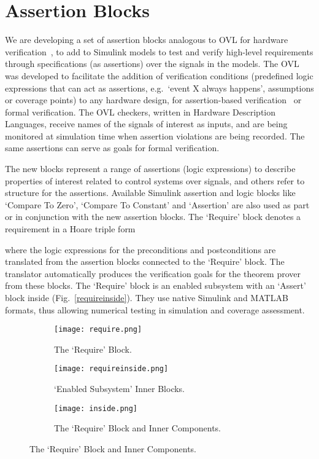 \documentclass[a4paper]{article}
\begin{document}
\section{Assertion Blocks}\label{assertions}

We are developing a set of assertion blocks analogous to OVL for hardware verification~\cite{OVL}, to add to Simulink models to test and verify high-level requirements through specifications (as assertions) over the signals in the models. The OVL was developed to facilitate the addition of verification conditions (predefined logic expressions that can act as assertions, e.g.\ `event X always happens', assumptions or coverage points) to any hardware design, for assertion-based verification~\cite{assertions} or formal verification. The OVL checkers, written in Hardware Description Languages, receive names of the signals of interest as inputs, and are being monitored at simulation time when assertion violations are being recorded. The same assertions can serve as goals for formal verification.

The new blocks represent a range of assertions (logic expressions) to describe properties of interest related to control systems over signals, and others refer to structure for the assertions. Available Simulink assertion and logic blocks like `Compare To Zero', `Compare To Constant' and `Assertion' are also used as part or in conjunction with the new assertion blocks. The `Require' block denotes a requirement in a Hoare triple form~\cite{Hoare}
 
where the logic expressions for the preconditions and postconditions are translated from the assertion blocks connected to the `Require' block. The translator automatically produces the verification goals for the theorem prover from these blocks. The `Require' block is an enabled subsystem with an `Assert' block inside (Fig.~\ref{requireinside}). They use native Simulink and MATLAB formats, thus allowing numerical testing in simulation and coverage assessment. 

\begin{figure}[!t]
\begin{center}
\begin{subfigure}{0.33\textwidth}
                \texttt{[image: require.png]}
                \caption{The `Require' Block.}
                \label{subsystem}
        \end{subfigure}\begin{subfigure}{0.33\textwidth}
                \texttt{[image: requireinside.png]}
                \caption{`Enabled Subsystem' Inner Blocks.}
                \label{subsystem}
        \end{subfigure}\begin{subfigure}{0.33\textwidth}
                \texttt{[image: inside.png]}
                \caption{The `Require' Block and Inner Components.}
                \label{subsystem}
        \end{subfigure}\end{center}
\end{figure}
\end{document}
